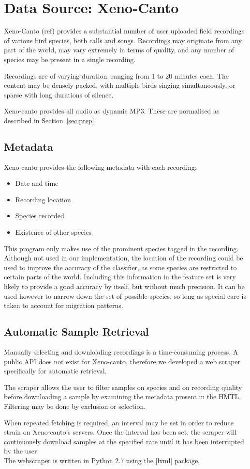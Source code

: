 \section{Data Source: Xeno-Canto}

Xeno-Canto (ref) provides a substantial number of user uploaded field recordings
of various bird species, both calls and songs.
Recordings may originate from any part of the world, may vary extremely in
terms of quality, and any number of species may be present in a single
recording.

Recordings are of varying duration, ranging from 1 to 20 minutes each.
The content may be densely packed, with multiple birds singing simultaneously,
or sparse with long durations of silence.

Xeno-canto provides all audio as dynamic MP3.
These are normalised as described in Section~\ref{sec:prep}

\subsection{Metadata}
Xeno-canto provides the following metadata with each recording:
\begin{itemize}[noitemsep]
  \item Date and time
  \item Recording location
  \item Species recorded
  \item Existence of other species
\end{itemize}

This program only makes use of the prominent species tagged in the recording.
Although not used in our implementation, the location of the recording could be
used to improve the accuracy of the classifier, as some species are restricted
to certain parts of the world.
Including this information in the feature set is very likely to provide a
good accuracy by itself, but without much precision.
It can be used however to narrow down the set of possible species, so long as
special care is taken to account for migration patterns.


\subsection{Automatic Sample Retrieval}
Manually selecting and downloading recordings is a time-consuming process.
A public API does not exist for Xeno-canto, therefore we developed a web scraper
specifically for automatic retrieval.

The scraper allows the user to filter samples on species and on recording quality
before downloading a sample by examining the metadata present in the HMTL.
Filtering may be done by exclusion or selection.

When repeated fetching is required, an interval may be set in order to reduce
strain on Xeno-canto's servers.
Once the interval has been set, the scraper will continuously download samples
at the specified rate until it has been interrupted by the user.\\

The webscraper is written in Python 2.7 using the |lxml| package.
